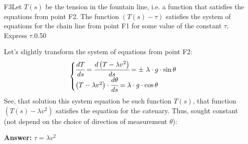\documentclass[11pt,a4paper]{article}
\begin{document}
\begin{solcard}{F3}{Let $T (s)$ be the tension in the fountain line, i.e. a function that satisfies the equations from point F2. The function $(T(s)-\tau)$ satisfies the system of equations for the chain line from point F1 for some value of the constant $\tau$. Express $\tau$.}{0.50}

Let's slightly transform the system of equations from point F2: $$ \begin{cases} \cfrac{dT}{ds} = \cfrac{d \left( T - \lambda v^2 \right)}{ds} = \pm~ \lambda \cdot g \cdot \sin \theta \\ \left( T - \lambda v^2 \right) \cdot \cfrac{d \theta}{ds} = \lambda \cdot g \cdot \cos \theta \end{cases} $$ See, that solution this system equation be such function $T(s)$, that function $\left( T(s) - \lambda v^2 \right)$ satisfies the equation for the catenary. Thus, sought constant (not depend on the choice of direction of measurement $\theta$):

\par\smallskip\noindent\textbf{Answer:} $\tau = \lambda v^2$
\end{solcard}
\end{document}
